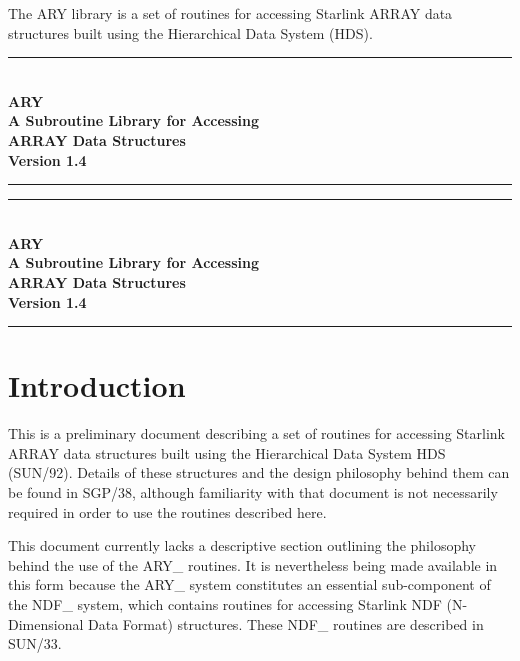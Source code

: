 \documentclass[twoside,11pt]{article}
\newcommand{\stardocinitials}  {SUN}
\newcommand{\stardocnumber}    {11.5}
\newcommand{\stardoctitle}     {ARY\\[\latex{2.5ex}]
                                A Subroutine Library for Accessing\\
                                ARRAY Data Structures}
\newcommand{\stardocversion}   {Version 1.4}
\newcommand{\stardocabstract}  {%
The ARY library is a set of routines for accessing Starlink ARRAY data
structures built using the Hierarchical Data System (HDS).
}
\newcommand{\stardocname}{\stardocinitials /\stardocnumber}
\newenvironment{latexonly}{}{}
\newcommand{\xref}[3]{#1}
\newcommand{\xlabel}[1]{}
\newcommand{\latex}[1]{#1}
\newcommand{\latexonlytoc}[0]{\tableofcontents}
\renewcommand{\thepage}{\roman{page}}
\begin{document}
\stardocabstract
  \newpage
  \begin{latexonly}
    \null\vspace {5mm}
    \begin {center}
    \rule{80mm}{0.5mm} \\ [1ex]
    {\Large\bf \stardoctitle \\ [2.5ex]
               \stardocversion} \\ [2ex]
    \rule{80mm}{0.5mm}
    \end{center}
    \setlength{\parskip}{0mm}
    \latexonlytoc
    \setlength{\parskip}{\medskipamount}
    \markboth{\stardocname}{\stardocname}
  \end{latexonly}
\cleardoublepage
\renewcommand{\thepage}{\arabic{page}}
\setcounter{page}{1}
\begin{latexonly}
\null\vspace {5mm}
\begin {center}
\rule{80mm}{0.5mm} \\ [1ex]
{\Large\bf \stardoctitle \\ [2.5ex]
           \stardocversion} \\ [2ex]
\rule{80mm}{0.5mm}
\end{center}
\end{latexonly}


\section{\xlabel{introduction}Introduction}
\label{introduction}

This is a preliminary document describing a set of routines for accessing
Starlink ARRAY data structures built using the Hierarchical Data System HDS
(\xref{SUN/92}{sun92}{}).  Details of these structures and the design
philosophy behind them can be found in \xref{SGP/38}{sgp38}{}, although
familiarity with that document is not necessarily required in order to
use the routines described here.

This document currently lacks a descriptive section outlining the
philosophy behind the use of the ARY\_ routines.  It is nevertheless
being made available in this form because the ARY\_ system constitutes
an essential sub-component of the NDF\_ system, which contains routines
for accessing Starlink NDF (N-Dimensional Data Format) structures.
These NDF\_ routines are described in \xref{SUN/33}{sun33}{}.
\end{document}
